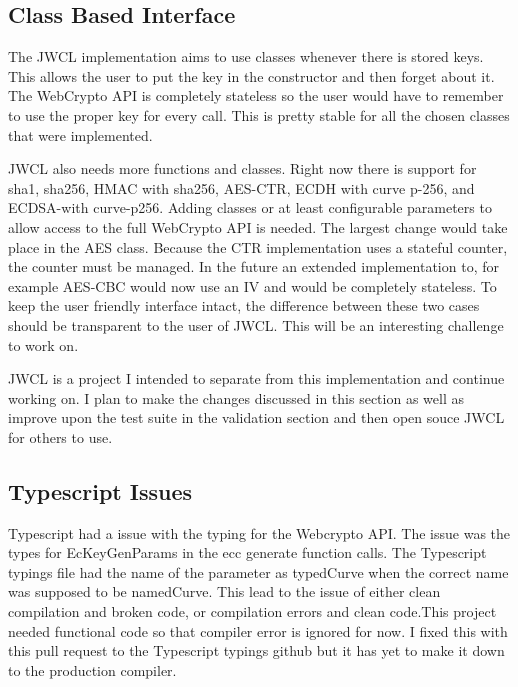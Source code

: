 \subsection{Class Based Interface}


The JWCL implementation aims to use classes whenever there is stored keys. This allows the user to put the key in the constructor and then forget about it. The WebCrypto API is completely stateless so the user would have to remember to use the proper key for every call. This is pretty stable for all the chosen classes that were implemented.


JWCL also needs more functions and classes. Right now there is support for sha1, sha256, HMAC with sha256, AES-CTR, ECDH with curve p-256, and ECDSA-with curve-p256. Adding classes or at least configurable parameters to allow access to the full WebCrypto API is needed. The largest change would take place in the AES class. Because the CTR implementation uses a stateful counter, the counter must be managed. In the future an extended implementation to, for example AES-CBC would now use an IV and would be completely stateless. To keep the user friendly interface intact, the difference between these two cases should be transparent to the user of JWCL. This will be an interesting challenge to work on. 


JWCL is a project I intended to separate from this implementation and continue working on. I plan to make the changes discussed in this section as well as improve upon the test suite in the validation section and then open souce JWCL for others to use.


\subsection{Typescript Issues}


Typescript had a issue with the typing for the Webcrypto API. The issue was the types for EcKeyGenParams in the ecc generate function calls. The Typescript typings file had the name of the parameter as typedCurve when the correct name was supposed to be namedCurve. This lead to the issue of either clean compilation and broken code, or compilation errors and clean code.This project needed functional code so that compiler error is ignored for now. I fixed this with this pull request to the Typescript typings github but it has yet to make it down to the production compiler. \cite{ts-pull} 



